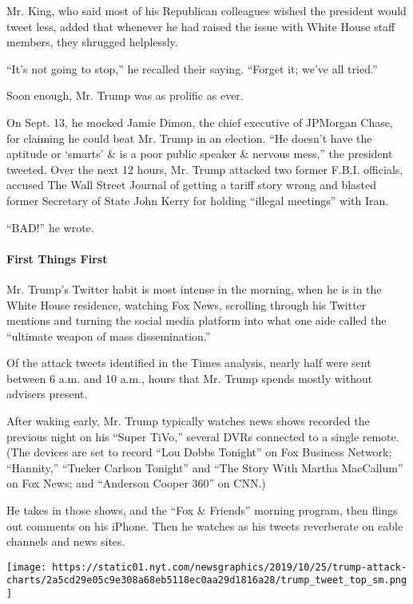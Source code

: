 Mr. King, who said most of his Republican colleagues wished the
president would tweet less, added that whenever he had raised the issue
with White House staff members, they shrugged helplessly.

``It's not going to stop,'' he recalled their saying. ``Forget it; we've
all tried.''

Soon enough, Mr. Trump was as prolific as ever.

On Sept. 13, he mocked Jamie Dimon, the chief executive of JPMorgan
Chase, for claiming he could beat Mr. Trump in an election. ``He doesn't
have the aptitude or `smarts' \& is a poor public speaker \& nervous
mess,'' the president tweeted. Over the next 12 hours, Mr. Trump
attacked two former F.B.I. officials, accused The Wall Street Journal of
getting a tariff story wrong and blasted former Secretary of State John
Kerry for holding ``illegal meetings'' with Iran.

``BAD!'' he wrote.

\hypertarget{first-things-first}{%
\paragraph{First Things First}\label{first-things-first}}

Mr. Trump's Twitter habit is most intense in the morning, when he is in
the White House residence, watching Fox News, scrolling through his
Twitter mentions and turning the social media platform into what one
aide called the ``ultimate weapon of mass dissemination.''

Of the attack tweets identified in the Times analysis, nearly half were
sent between 6 a.m. and 10 a.m., hours that Mr. Trump spends mostly
without advisers present.

After waking early, Mr. Trump typically watches news shows recorded the
previous night on his ``Super TiVo,'' several DVRs connected to a single
remote. (The devices are set to record ``Lou Dobbs Tonight'' on Fox
Business Network; ``Hannity,'' ``Tucker Carlson Tonight'' and ``The
Story With Martha MacCallum'' on Fox News; and ``Anderson Cooper 360''
on CNN.)

He takes in those shows, and the ``Fox \& Friends'' morning program,
then flings out comments on his iPhone. Then he watches as his tweets
reverberate on cable channels and news sites.

\texttt{[image: https://static01.nyt.com/newsgraphics/2019/10/25/trump-attack-charts/2a5cd29e05c9e308a68eb5118ec0aa29d1816a28/trump\_tweet\_top\_sm.png]}

